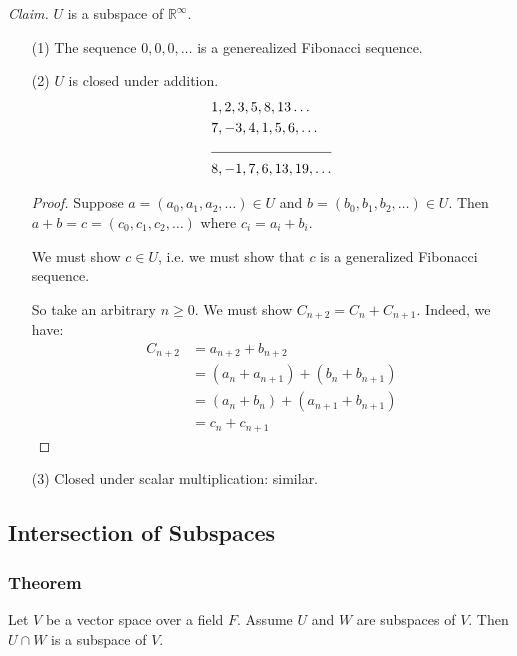 \documentclass[11pt]{article}
\begin{document}
\begin{enumerate}
        \emph{Claim.} $U$ is a subspace of \(\mathbb{R}^{\infty}\).
        \begin{enumerate}
            \item[(1)] The sequence \(0,0,0, \dots\) is a generealized Fibonacci sequence.
            \item[(2)] $U$ is closed under addition.
            \begin{align*}
                & 1,2,3,5,8,13 \dots \\
                & 7, -3,4,1,5,6, \dots \\
                \cline{1-2}
                & 8,-1,7,6,13,19, \dots
            \end{align*}
            \begin{proof}
                Suppose \(a = (a_0, a_1, a_2, \dots) \in U\) and \(b = (b_0, b_1, b_2, \dots) \in U.\) Then \(a + b = c = (c_0, c_1, c_2, \dots)\) where \(c_i = a_i + b_i.\) 

                We must show \(c \in U\), i.e. we must show that $c$ is a generalized Fibonacci sequence.

                So take an arbitrary \(n \geq 0\). We must show \(C_{n+2} = C_n + C_{n+1}\). Indeed, we have:
                \begin{align*}
                    C_{n+2} &= a_{n+2} + b_{n+2} \\
                            &= (a_n + a_{n+1}) + (b_n + b_{n+1}) \\
                            &= (a_n + b_n) + (a_{n+1} + b_{n+1}) \\
                            &= c_n + c_{n+1}
                \end{align*}
            \end{proof}
            \item[(3)] Closed under scalar multiplication: similar.
        \end{enumerate}
    \end{enumerate}

    \subsection{Intersection of Subspaces}

    \subsubsection{Theorem}

    Let $V$ be a vector space over a field $F$. Assume $U$ and $W$ are subspaces of $V$. Then \(U \cap W\) is a subspace of $V$.
\end{document}
